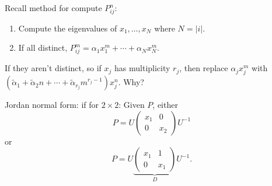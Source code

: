 \documentclass[10pt, a4paper]{article}
\begin{document}
\begin{problem}
    Recall method for compute $P_{ij}^{n}$:
    \begin{enumerate}[label = (\arabic*)]
        \item Compute the eigenvalues of $x_1, \dotsc, x_N$ where $N = |i|$.

        \item If all distinct,
        $P_{ij}^{m} = \alpha_1x_1 ^ {m} + \dotsi + \alpha_Nx_N ^ m$.
    \end{enumerate}
    If they aren't distinct,
    so if $x_j$ has multiplicity $r_j$,
    then replace $\alpha_jx_j ^ m$ with $(\tilde{\alpha}_1 + \tilde{\alpha}_2n + \dotsi + \tilde{\alpha}_{r_j}m ^ {r_j - 1})x_{j}^{n}$.
    Why?

    \begin{solution}
        Jordan normal form:
        if for $2 \times 2$:
        Given $P$,
        either
        \[
        P = U\begin{pmatrix}
            x_1 & 0 \\ 0 & x_2
        \end{pmatrix}U ^ {-1}
        \]
        or
        \[
        P = U\underbrace{\begin{pmatrix}
            x_1 & 1 \\ 0 & x_1
        \end{pmatrix}}_{D}U ^ {-1}.
        \]


\end{solution}
\end{problem}
\end{document}

